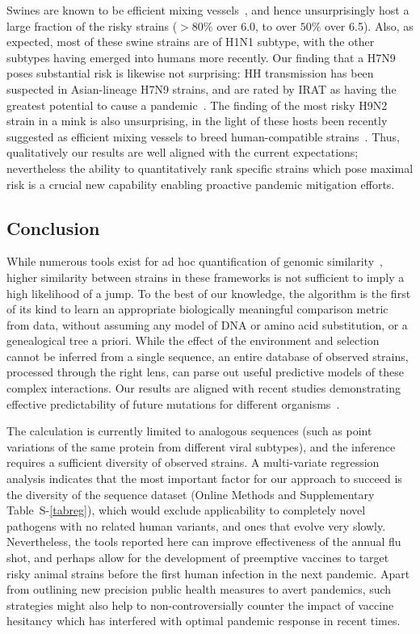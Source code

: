 \documentclass[onecolumn, compsoc,10pt]{IEEEtran}
\def\SUPPLEMENTARY{Supplementary\xspace}
\def\METHODS{Online Methods\xspace}
\begin{document}
Swines are known to be efficient mixing vessels~\cite{ma2009pig,nelson2018origins,reid2003origin,Baumann}, and hence unsurprisingly host a large fraction of the risky strains ($>80\%$ over 6.0, to over $50\%$ over 6.5). Also, as  expected, most of these swine strains are of  H1N1 subtype, with the other subtypes  having emerged into humans more recently. Our finding that a H7N9 poses substantial risk is likewise not surprising:
HH transmission has been suspected in Asian-lineage H7N9 strains, and are rated by IRAT as having the greatest potential to cause a pandemic~\cite{qi2013probable}. The finding of  the most risky H9N2 strain in a mink is also unsurprising, in the light of these hosts  been recently suggested as efficient mixing vessels to breed human-compatible strains~\cite{sun2021mink}. Thus,  qualitatively our results  are well aligned with the current expectations; nevertheless the ability to quantitatively rank  specific strains which pose maximal risk is a crucial new capability enabling proactive pandemic mitigation efforts.

\subsection*{Conclusion}
While numerous tools exist for ad hoc quantification of genomic similarity~\cite{posada1998modeltest,goldberger2005genomic,huelsenbeck1997phylogeny,neher2014predicting,VanderMeer2010,Smith2009}, higher similarity between strains in  these frameworks is not sufficient to imply a high likelihood of a jump. To the best of our knowledge, the \enet algorithm is  the first of its kind to learn an appropriate biologically meaningful comparison metric from data, without assuming any model of DNA or amino acid substitution, or a genealogical tree a priori. While the effect of the environment and selection cannot be inferred from a single sequence, an entire database of observed strains, processed through the right lens, can parse out useful predictive models of these complex interactions. Our results are  aligned with recent studies demonstrating effective  predictability of  future mutations  for different organisms~\cite{mollentze2021identifying,maher2021predicting}.

The \qdist calculation is currently limited to analogous sequences (such as point variations of the same protein from different viral subtypes), and the \enet inference requires a  sufficient diversity of observed strains. A multi-variate regression analysis indicates  that the most important factor for our approach to succeed is  the diversity of the sequence dataset (\METHODS and \SUPPLEMENTARY  Table~S-\ref{tabreg}), which would exclude applicability to completely novel pathogens with no related human variants, and ones that evolve very slowly. Nevertheless, the tools reported here can improve effectiveness of the annual flu shot, and perhaps allow for the development of preemptive vaccines to  target risky animal strains  before the first human infection in the next pandemic.
Apart from outlining new precision public health measures to avert pandemics, such strategies might also help to non-controversially counter the impact of vaccine hesitancy which has interfered with optimal pandemic response in recent times.
\end{document}
